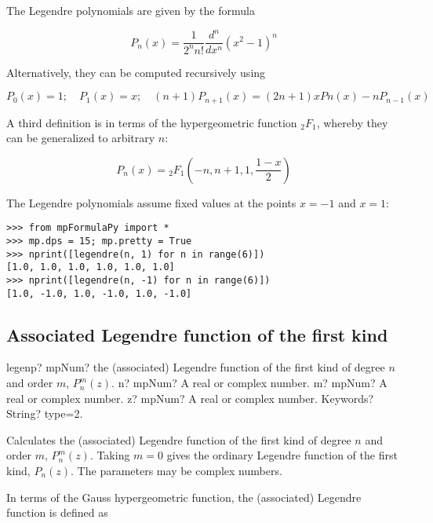 \vpara
The Legendre polynomials are given by the formula

\begin{equation}
P_n(x)= \frac{1}{2^n n!} \frac{d^n}{dx^n}(x^2-1)^n
\end{equation}

Alternatively, they can be computed recursively using

\begin{equation}
P_0(x)=1; \quad P_1(x)=x; \quad (n+1)P_{n+1}(x)=(2n+1)xPn(x)-nP_{n-1}(x)
\end{equation}

A third definition is in terms of the hypergeometric function ${}_2F_1$, whereby they can be generalized to arbitrary $n$:

\begin{equation}
P_n(x)={}_2F_1\left(-n, n+1, 1, \frac{1-x}{2} \right)
\end{equation}

The Legendre polynomials assume fixed values at the points $x=-1$ and $x=1$:

\begin{lstlisting}
>>> from mpFormulaPy import *
>>> mp.dps = 15; mp.pretty = True
>>> nprint([legendre(n, 1) for n in range(6)])
[1.0, 1.0, 1.0, 1.0, 1.0, 1.0]
>>> nprint([legendre(n, -1) for n in range(6)])
[1.0, -1.0, 1.0, -1.0, 1.0, -1.0]
\end{lstlisting}




\subsection{Associated Legendre function of the first kind}

\begin{mpFunctionsExtract}
	\mpFunctionFour
	{legenp? mpNum? the (associated) Legendre function of the first kind of degree $n$ and order $m$, $P_n^m(z)$.}
	{n? mpNum? A real or complex number.}
	{m? mpNum? A real or complex number.}	
	{z? mpNum? A real or complex number.}		
	{Keywords? String? type=2.}	
\end{mpFunctionsExtract}

\vpara
Calculates the (associated) Legendre function of the first kind of degree $n$ and order $m$, $P_n^m(z)$. Taking $m=0$ gives the ordinary Legendre function of the first kind, $P_n(z)$. The parameters may be complex numbers.

\vpara
In terms of the Gauss hypergeometric function, the (associated) Legendre function is defined as

